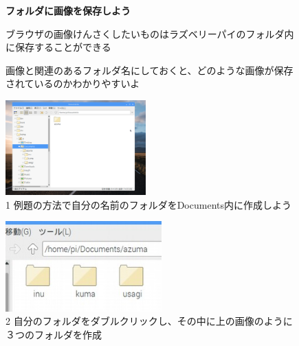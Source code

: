 \documentclass[a4paper,12pt]{jarticle}
\begin{document}
\begin{figure}[t]
  \flushleft
  {\bfseries
    フォルダに画像を保存しよう}

  ブラウザの画像けんさくしたいものはラズベリーパイのフォルダ内に保存することができる

  画像と関連のあるフォルダ名にしておくと、どのような画像が保存されているのかわかりやすいよ



  \begin{minipage}{\textwidth}
    \begin{minipage}{6.582cm}
      \includegraphics[width=5.401cm]{textbook-img093.png}\\
      1 例題の方法で自分の名前のフォルダをDocuments内に作成しよう
    \end{minipage}
    \begin{minipage}{3.582cm}
    \end{minipage}
    \begin{minipage}{6.582cm}
      \includegraphics[width=5.995cm]{textbook-img094.jpg}\\
      2 自分のフォルダをダブルクリックし、その中に上の画像のように３つのフォルダを作成
    \end{minipage}
  \end{minipage}



\end{figure}
\end{document}
